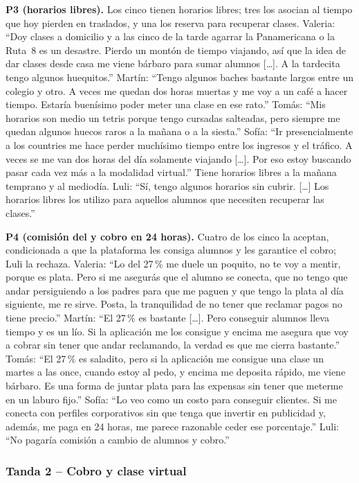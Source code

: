 \textbf{P3 (horarios libres).} Los cinco tienen horarios libres; tres
los asocian al tiempo que hoy pierden en traslados, y una los reserva
para recuperar clases. Valeria: ``Doy clases
a domicilio y a las cinco de la tarde agarrar la Panamericana o la
Ruta~8 es un desastre. Pierdo un montón de tiempo viajando, así que la
idea de dar clases desde casa me viene bárbaro para sumar alumnos [\ldots].
A la tardecita tengo algunos huequitos.'' Martín: ``Tengo algunos baches
bastante largos entre un colegio y otro. A veces me quedan dos horas
muertas y me voy a un café a hacer tiempo. Estaría buenísimo poder meter
una clase en ese rato.'' Tomás: ``Mis horarios son medio un tetris
porque tengo cursadas salteadas, pero siempre me quedan algunos huecos
raros a la mañana o a la siesta.'' Sofía: ``Ir presencialmente a los
countries me hace perder muchísimo tiempo entre los ingresos y el
tráfico. A veces se me van dos horas del día solamente viajando [\ldots].
Por eso estoy buscando pasar cada vez más a la modalidad virtual.''
Tiene horarios libres a la mañana temprano y al mediodía. Luli: ``Sí,
tengo algunos horarios sin cubrir. [\ldots] Los horarios libres los
utilizo para aquellos alumnos que necesiten recuperar las clases.''

\textbf{P4 (comisión del \comision{} y cobro en 24 horas).} Cuatro de
los cinco la aceptan, condicionada a que la plataforma les consiga
alumnos y les garantice el cobro; Luli la rechaza. Valeria: ``Lo del 27\,\% me duele un poquito, no te
voy a mentir, porque es plata. Pero si me asegurás que el alumno se
conecta, que no tengo que andar persiguiendo a los padres para que me
paguen y que tengo la plata al día siguiente, me re sirve. Posta, la
tranquilidad de no tener que reclamar pagos no tiene precio.'' Martín:
``El 27\,\% es bastante [\ldots]. Pero conseguir alumnos lleva tiempo y es
un lío. Si la aplicación me los consigue y encima me asegura que voy a
cobrar sin tener que andar reclamando, la verdad es que me cierra
bastante.'' Tomás: ``El 27\,\% es saladito, pero si la aplicación me
consigue una clase un martes a las once, cuando estoy al pedo, y encima
me deposita rápido, me viene bárbaro. Es una forma de juntar plata para
las expensas sin tener que meterme en un laburo fijo.'' Sofía: ``Lo veo
como un costo para conseguir clientes. Si \sistema{} me conecta con
perfiles corporativos sin que tenga que invertir en publicidad y,
además, me paga en 24 horas, me parece razonable ceder ese porcentaje.''
Luli: ``No pagaría comisión a cambio de alumnos y cobro.''

\subsubsection*{Tanda 2 -- Cobro y clase virtual}

